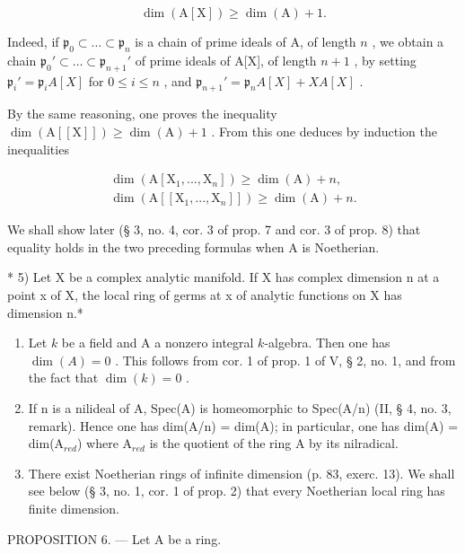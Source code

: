\[
\dim (\mathrm{A} [ \mathrm{X} ]) \geqslant \dim (\mathrm{A}) + 1.
\]

Indeed, if \(\mathfrak{p}_0 \subset \ldots \subset \mathfrak{p}_n\) is a chain of prime ideals of A, of length \(n\) , we obtain a chain \(\mathfrak{p}_0' \subset \ldots \subset \mathfrak{p}_{n+1}'\){}{} of prime ideals of A[X], of length \(n+1\) , by setting \(\mathfrak{p}_i' = \mathfrak{p}_iA[X]\) for \(0 \leqslant i \leqslant n\) , and \(\mathfrak{p}_{n+1}' = \mathfrak{p}_nA[X] + XA[X]\) .

By the same reasoning, one proves the inequality \(\dim(\mathrm{A}[[\mathrm{X}]]) \geqslant \dim(\mathrm{A}) + 1\) . From this one deduces by induction the inequalities

\[
\begin{array}{l} \dim (\mathrm{A} [ \mathrm{X} _ {1},..., \mathrm{X} _ {n} ]) \geqslant \dim (\mathrm{A}) + n, \\ \dim (\mathrm{A} [ [ \mathrm{X} _ {1},..., \mathrm{X} _ {n} ] ]) \geqslant \dim (\mathrm{A}) + n. \end{array}
\]

We shall show later (§ 3, no. 4, cor. 3 of prop. 7 and cor. 3 of prop. 8) that equality holds in the two preceding formulas when A is Noetherian.

* 5) Let X be a complex analytic manifold. If X has complex dimension n at a point x of X, the local ring of germs at x of analytic functions on X has dimension n.*

\begin{enumerate}
\def\labelenumi{\arabic{enumi})}
\setcounter{enumi}{5}
\item
  Let \(k\) be a field and A a nonzero integral \(k\)-algebra. Then one has \(\dim(A) = 0\) . This follows from cor. 1 of prop. 1 of V, § 2, no. 1, and from the fact that \(\dim(k) = 0\) .
\item
  If n is a nilideal of A, Spec(A) is homeomorphic to Spec(A/n) (II, § 4, no. 3, remark). Hence one has dim(A/n) = dim(A); in particular, one has dim(A) = dim(A\(_{red}\)) where A\(_{red}\) is the quotient of the ring A by its nilradical.
\item
  There exist Noetherian rings of infinite dimension (p. 83, exerc. 13). We shall see below (§ 3, no. 1, cor. 1 of prop. 2) that every Noetherian local ring has finite dimension.
\end{enumerate}

PROPOSITION 6. --- Let A be a ring.


